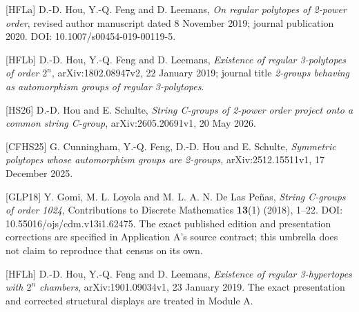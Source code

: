 \documentclass[
  11pt,
  a4paper,
]{article}
\begin{document}
{[}HFLa{]} D.-D. Hou, Y.-Q. Feng and D. Leemans, \emph{On regular
polytopes of 2-power order}, revised author manuscript dated 8 November
2019; journal publication 2020. DOI: 10.1007/s00454-019-00119-5.

{[}HFLb{]} D.-D. Hou, Y.-Q. Feng and D. Leemans, \emph{Existence of
regular 3-polytopes of order \(2^n\)}, arXiv:1802.08947v2, 22 January
2019; journal title \emph{2-groups behaving as automorphism groups of
regular 3-polytopes}.

{[}HS26{]} D.-D. Hou and E. Schulte, \emph{String C-groups of 2-power
order project onto a common string C-group}, arXiv:2605.20691v1, 20 May
2026.

{[}CFHS25{]} G. Cunningham, Y.-Q. Feng, D.-D. Hou and E. Schulte,
\emph{Symmetric polytopes whose automorphism groups are 2-groups},
arXiv:2512.15511v1, 17 December 2025.

{[}GLP18{]} Y. Gomi, M. L. Loyola and M. L. A. N. De Las Peñas,
\emph{String C-groups of order 1024}, Contributions to Discrete
Mathematics \textbf{13}(1) (2018), 1--22. DOI:
10.55016/ojs/cdm.v13i1.62475. The exact published edition and
presentation corrections are specified in Application A's source
contract; this umbrella does not claim to reproduce that census on its
own.

{[}HFLh{]} D.-D. Hou, Y.-Q. Feng and D. Leemans, \emph{Existence of
regular 3-hypertopes with \(2^n\) chambers}, arXiv:1901.09034v1, 23
January 2019. The exact presentation and corrected structural displays
are treated in Module A.
\end{document}

